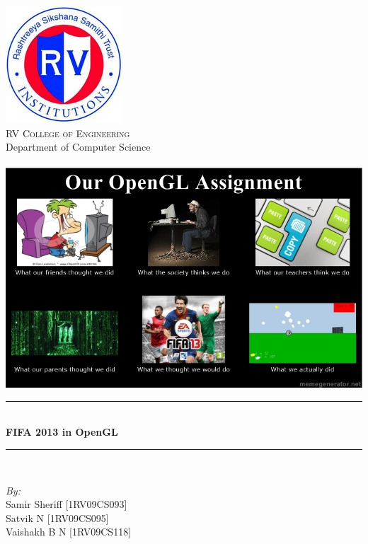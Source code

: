 \documentclass[12pt]{article} %
\date{}
\title{}
\newcommand{\HRule}{\rule{\linewidth}{0.5mm}}
\begin{document}
\maketitle
\begin{titlepage}

\begin{center}


\includegraphics[scale=0.5]{RVCE.png}\\[1cm]    

\textsc{\LARGE  RV College of Engineering}\\[0.5cm]
\large{Department of Computer Science}\\[1cm]
\textsc{\Large }\\[0.5cm]

\includegraphics[scale=0.9]{whatwedid.png}\\[1cm]    

\HRule \\[0.4cm]
{  \huge\bfseries FIFA 2013 in OpenGL }\\[0.4cm]

\HRule \\[1cm]

\begin{minipage}{0.8\textwidth}
\begin{flushleft} \large
\emph{By:}\\
Samir Sheriff [1RV09CS093]\\
Satvik \textsc{N} [1RV09CS095]\\
Vaishakh \textsc{B N} [1RV09CS118]\\

\end{flushleft}
\end{minipage}
\vfill
\date{}
{\large}

\end{center}

\end{titlepage}
\end{document}
